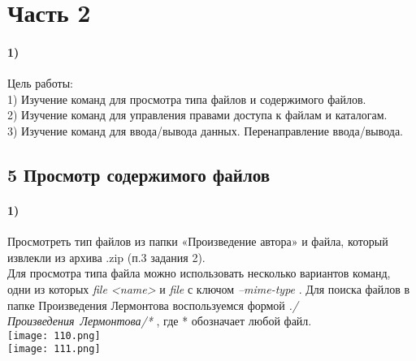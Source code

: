 \newpage
\section*{Часть 2}
	\paragraph{1)}
	Цель работы:  \\

	1) Изучение команд для просмотра типа файлов и содержимого файлов. \\

	2) Изучение команд для управления правами доступа к файлам и каталогам. \\

	3) Изучение команд для ввода/вывода данных. Перенаправление ввода/вывода. \\
	\subsection*{5 Просмотр содержимого файлов}
	
		\paragraph{1)}
		Просмотреть тип файлов из папки «Произведение автора» и файла, который извлекли из архива .zip (п.3 задания 2). 
		\\
	 	Для просмотра типа файла можно использовать несколько вариантов команд, 		одни из 			которых \textit{file <name>} и \textit{file} с ключом 			\textit{--mime-type} . Для 			поиска файлов в папке Произведения 				Лермонтова воспользуемся формой \textit{./				Произведения\ 				Лермонтова/*} , где * обозначает любой файл.
	\\
	\texttt{[image: 110.png]} %
	\\
	\texttt{[image: 111.png]} %
	\\
	
